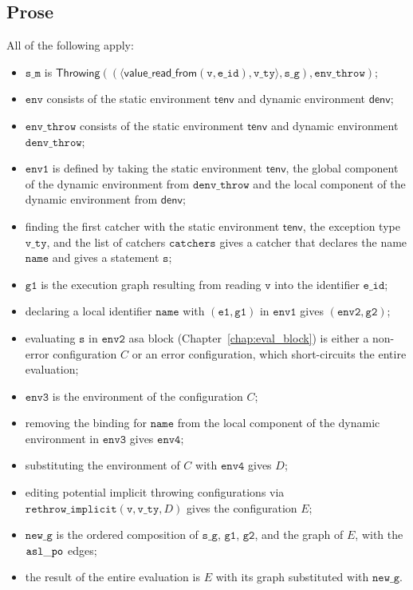 \documentclass{book}
\newcommand\chapref[1]{Chapter~\ref{chap:#1}}
\newcommand\tenv[0]{\textsf{tenv}}
\newcommand\denv[0]{\textsf{denv}}
\newcommand\ProseOrError[0]{or an error configuration, which short-circuits the entire evaluation}
\newcommand\rethrowimplicit[0]{\texttt{rethrow\_implicit}}
\newcommand\valuereadfrom[0]{\textsf{value\_read\_from}}
\newcommand\Throwing[0]{\textsf{Throwing}}
\newcommand\env[0]{\texttt{env}}
\newcommand\envone[0]{\texttt{env1}}
\newcommand\envtwo[0]{\texttt{env2}}
\newcommand\envthree[0]{\texttt{env3}}
\newcommand\envfour[0]{\texttt{env4}}
\newcommand\newg[0]{\texttt{new\_g}}
\newcommand\vv[0]{\texttt{v}}
\newcommand\vs[0]{\texttt{s}}
\newcommand\veone[0]{\texttt{e1}}
\newcommand\vgone[0]{\texttt{g1}}
\newcommand\vgtwo[0]{\texttt{g2}}
\newcommand\name[0]{\texttt{name}}
\newcommand\catchers[0]{\texttt{catchers}}
\newcommand\envthrow[0]{\texttt{env\_throw}}
\newcommand\denvthrow[0]{\texttt{denv\_throw}}
\newcommand\sm[0]{\texttt{s\_m}}
\newcommand\sg[0]{\texttt{s\_g}}
\newcommand\vvty[0]{\texttt{v\_ty}}
\newcommand\eid[0]{\texttt{e\_id}}
\begin{document}
  \subsection{Prose}
  All of the following apply:
  \begin{itemize}
    \item $\sm$ is $\Throwing((\langle \valuereadfrom(\vv, \eid), \vvty \rangle, \sg), \envthrow)$;
    \item $\env$ consists of the static environment $\tenv$ and dynamic environment $\denv$;
    \item $\envthrow$ consists of the static environment $\tenv$ and dynamic environment \\ $\denvthrow$;
    \item $\envone$ is defined by taking the static environment $\tenv$, the global component of the dynamic
    environment from $\denvthrow$ and the local component of the dynamic environment from $\denv$;
    \item finding the first catcher with the static environment $\tenv$, the exception type $\vvty$,
    and the list of catchers $\catchers$ gives a catcher that declares the name $\name$ and gives a statement $\vs$;
    \item $\vgone$ is the execution graph resulting from reading $\vv$ into the identifier $\eid$;
    \item declaring a local identifier $\name$ with $(\veone, \vgone)$ in $\envone$ gives $(\envtwo, \vgtwo)$;
    \item evaluating $\vs$ in $\envtwo$ asa block (\chapref{eval_block}) is either a non-error
    configuration $C$ \ProseOrError;
    \item $\envthree$ is the environment of the configuration $C$;
    \item removing the binding for $\name$ from the local component of the dynamic environment in $\envthree$
    gives $\envfour$;
    \item substituting the environment of $C$ with $\envfour$ gives $D$;
    \item editing potential implicit throwing configurations via $\rethrowimplicit(\vv, \vvty, D)$
    gives the configuration $E$;
    \item $\newg$ is the ordered composition of $\sg$, $\vgone$, $\vgtwo$, and the graph of $E$,
    with the $\mathtt{asl\_po}$ edges;
    \item the result of the entire evaluation is $E$ with its graph substituted with $\newg$.
  \end{itemize}
\end{document}
